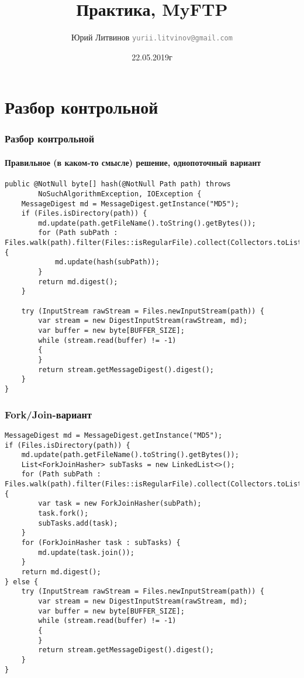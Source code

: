 \documentclass[xetex,mathserif,serif]{beamer}
\title{Практика, MyFTP}
\author[Юрий Литвинов]{Юрий Литвинов \newline \textcolor{gray}{\small\texttt{yurii.litvinov@gmail.com}}}
\date{22.05.2019г}
\begin{document}
	
	\frame{\titlepage}
	
	\section{Разбор контрольной}

	\begin{frame}[fragile]
		\frametitle{Разбор контрольной}
		\framesubtitle{Правильное (в каком-то смысле) решение, однопоточный вариант}
		\begin{scriptsize}
			\begin{verbatim}
public @NotNull byte[] hash(@NotNull Path path) throws 
        NoSuchAlgorithmException, IOException {
    MessageDigest md = MessageDigest.getInstance("MD5");
    if (Files.isDirectory(path)) {
        md.update(path.getFileName().toString().getBytes());
        for (Path subPath : Files.walk(path).filter(Files::isRegularFile).collect(Collectors.toList())) {
            md.update(hash(subPath));
        }
        return md.digest();
    }

    try (InputStream rawStream = Files.newInputStream(path)) {
        var stream = new DigestInputStream(rawStream, md);
        var buffer = new byte[BUFFER_SIZE];
        while (stream.read(buffer) != -1)
        {
        }
        return stream.getMessageDigest().digest();
    }
}
			\end{verbatim}
		\end{scriptsize}
\end{frame}

	\begin{frame}[fragile]
		\frametitle{Fork/Join-вариант}
		\begin{scriptsize}
			\begin{verbatim}
MessageDigest md = MessageDigest.getInstance("MD5");
if (Files.isDirectory(path)) {
    md.update(path.getFileName().toString().getBytes());
    List<ForkJoinHasher> subTasks = new LinkedList<>();
    for (Path subPath : Files.walk(path).filter(Files::isRegularFile).collect(Collectors.toList())) {
        var task = new ForkJoinHasher(subPath);
        task.fork();
        subTasks.add(task);
    }
    for (ForkJoinHasher task : subTasks) {
        md.update(task.join());
    }
    return md.digest();
} else {
    try (InputStream rawStream = Files.newInputStream(path)) {
        var stream = new DigestInputStream(rawStream, md);
        var buffer = new byte[BUFFER_SIZE];
        while (stream.read(buffer) != -1)
        {
        }
        return stream.getMessageDigest().digest();
    }
}
			\end{verbatim}
		\end{scriptsize}
	\end{frame}
\end{document}
